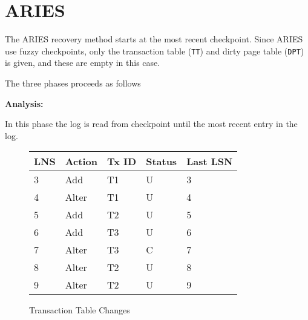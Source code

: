 
\section{ARIES}

The ARIES recovery method starts at the most recent checkpoint. Since ARIES
use fuzzy checkpoints, only the transaction table ({\tt TT}) and dirty page
table ({\tt DPT}) is given, and these are empty in this case.

\noindent
The three phases proceeds as follows

\noindent
{\bf Analysis:}

In this phase the log is read from checkpoint until the most recent entry in
the log.

\begin{figure}[H]
    \centering
    \begin{tabular}{|l|l|l|l|l|}
        \hline
        {\bf LNS} & {\bf Action}   & {\bf Tx ID}  & {\bf Status}  & {\bf Last LSN} \\ \hline
        3 & Add     & T1 & U & 3 \\ \hline %
        4 & Alter   & T1 & U & 4 \\ \hline %
        5 & Add     & T2 & U & 5 \\ \hline
        6 & Add     & T3 & U & 6 \\ \hline
        7 & Alter   & T3 & C & 7 \\ \hline
        8 & Alter   & T2 & U & 8 \\ \hline
        9 & Alter   & T2 & U & 9 \\ \hline
    \end{tabular}
    \caption{Transaction Table Changes}
    \label{fig:tt}
\end{figure}

